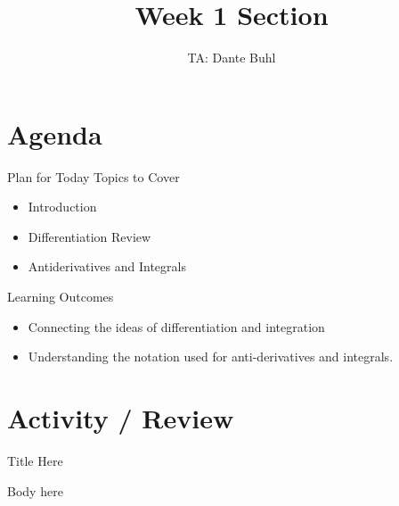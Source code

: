 \documentclass{beamer}
\title{Week 1 Section}
\author{TA: Dante Buhl}
\institute{UCSC AM-11B}
\begin{document}
\newcommand{\bmp}[1]{\begin{minipage}{#1\textwidth}}
\newcommand{\emp}{\end{minipage}}


\frame{\titlepage}

\section{Agenda}
\begin{frame}{Plan for Today}
    Topics to Cover
    \begin{itemize}
        \item Introduction
        \item Differentiation Review
        \item Antiderivatives and Integrals
    \end{itemize}
\end{frame}

\begin{frame}{Learning Outcomes}
    \begin{itemize}
        \item Connecting the ideas of differentiation and integration
        \item Understanding the notation used for anti-derivatives and integrals.
    \end{itemize}
\end{frame}

\section{Activity / Review}

\begin{frame}{Title Here}

    Body here

\end{frame}
\end{document}

